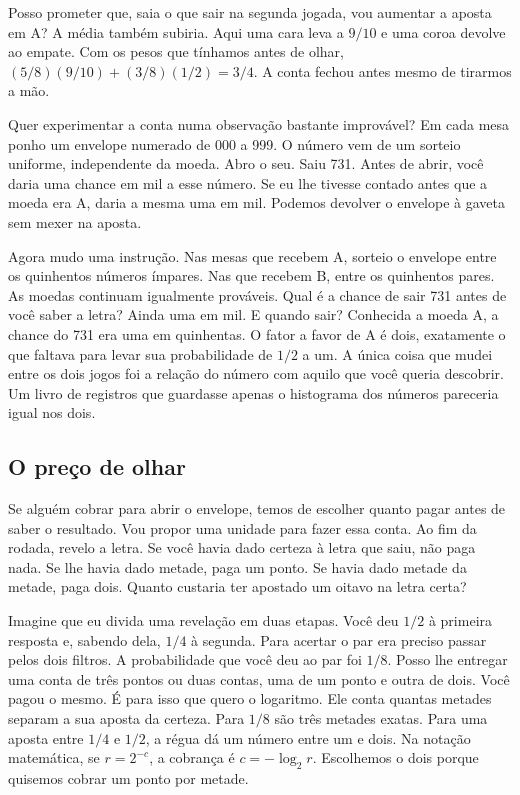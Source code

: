 \documentclass[12pt,oneside]{article}
\newcommand{\secao}[1]{\Needspace{5.2\baselineskip}\subsection*{#1}}
\newcommand{\bookanchor}[1]{\phantomsection\label{#1}}
\begin{document}
Posso prometer que, saia o que sair na segunda jogada, vou aumentar a aposta em A? A média também subiria. Aqui uma cara leva a $9/10$ e uma coroa devolve ao empate. Com os pesos que tínhamos antes de olhar, $(5/8)(9/10)+(3/8)(1/2)=3/4$. A conta fechou antes mesmo de tirarmos a mão.

Quer experimentar a conta numa observação bastante improvável? Em cada mesa ponho um envelope numerado de 000 a 999. O número vem de um sorteio uniforme, independente da moeda. Abro o seu. Saiu 731. Antes de abrir, você daria uma chance em mil a esse número. Se eu lhe tivesse contado antes que a moeda era A, daria a mesma uma em mil. Podemos devolver o envelope à gaveta sem mexer na aposta.

Agora mudo uma instrução. Nas mesas que recebem A, sorteio o envelope entre os quinhentos números ímpares. Nas que recebem B, entre os quinhentos pares. As moedas continuam igualmente prováveis. Qual é a chance de sair 731 antes de você saber a letra? Ainda uma em mil. E quando sair? Conhecida a moeda A, a chance do 731 era uma em quinhentas. O fator a favor de A é dois, exatamente o que faltava para levar sua probabilidade de $1/2$ a um. A única coisa que mudei entre os dois jogos foi a relação do número com aquilo que você queria descobrir. Um livro de registros que guardasse apenas o histograma dos números pareceria igual nos dois.

\secao{O preço de olhar}
Se\bookanchor{topic-02-1} alguém cobrar para abrir o envelope, temos de escolher quanto pagar antes de saber o resultado. Vou propor uma unidade para fazer essa conta. Ao fim da rodada, revelo a letra. Se você havia dado certeza à letra que saiu, não paga nada. Se lhe havia dado metade, paga um ponto. Se havia dado metade da metade, paga dois. Quanto custaria ter apostado um oitavo na letra certa?

Imagine que eu divida uma revelação em duas etapas. Você deu $1/2$ à primeira resposta e, sabendo dela, $1/4$ à segunda. Para acertar o par era preciso passar pelos dois filtros. A probabilidade que você deu ao par foi $1/8$. Posso lhe entregar uma conta de três pontos ou duas contas, uma de um ponto e outra de dois. Você pagou o mesmo. É para isso que quero o logaritmo. Ele conta quantas metades separam a sua aposta da certeza. Para $1/8$ são três metades exatas. Para uma aposta entre $1/4$ e $1/2$, a régua dá um número entre um e dois. Na notação matemática, se $r=2^{-c}$, a cobrança é $c=-\log_2 r$. Escolhemos o dois porque quisemos cobrar um ponto por metade.
\end{document}
